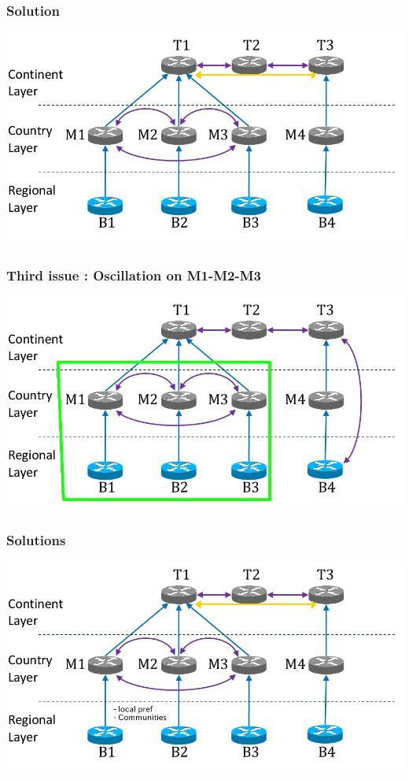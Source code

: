 \documentclass[handout,usenames,dvipsnames]{beamer}
\begin{document}
\begin{frame}
\frametitle{Solution}
\includegraphics[scale=0.35]{solutions.png}
\end{frame}

\begin{frame}
\frametitle{Third issue : Oscillation on M1-M2-M3}
\includegraphics[scale=0.35]{third_issue.png}
\end{frame}

\begin{frame}
\frametitle{Solutions}
\includegraphics[scale=0.35]{solutions3.png}
\end{frame}
\end{document}
